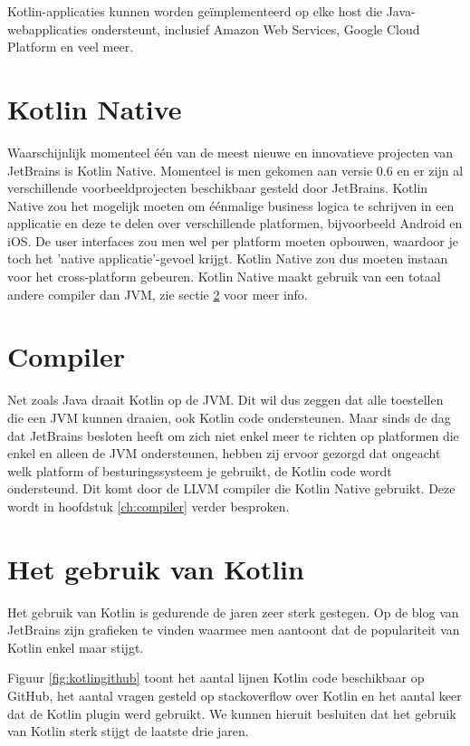 Kotlin-applicaties kunnen worden geïmplementeerd op elke host die Java-webapplicaties ondersteunt, inclusief Amazon Web Services, Google Cloud Platform en veel meer.

\section{Kotlin Native}
\label{sec:kotlinnative}
Waarschijnlijk momenteel één van de meest nieuwe en innovatieve projecten van JetBrains is Kotlin Native. Momenteel is men gekomen aan versie 0.6 en er zijn al verschillende voorbeeldprojecten beschikbaar gesteld door JetBrains. Kotlin Native zou het mogelijk moeten om éénmalige business logica te schrijven in een applicatie en deze te delen over verschillende platformen, bijvoorbeeld Android en iOS. De user interfaces zou men wel per platform moeten opbouwen, waardoor je toch het 'native applicatie'-gevoel krijgt. Kotlin Native zou dus moeten instaan voor het cross-platform gebeuren. Kotlin Native maakt gebruik van een totaal andere compiler dan JVM, zie sectie \ref{sec:llvm} voor meer info.

\section{Compiler}
\label{sec:llvm}
Net zoals Java draait Kotlin op de JVM. Dit wil dus zeggen dat alle toestellen die een JVM kunnen draaien, ook Kotlin code ondersteunen. Maar sinds de dag dat JetBrains besloten heeft om zich niet enkel meer te richten op platformen die enkel en alleen de JVM ondersteunen, hebben zij ervoor gezorgd dat ongeacht welk platform of besturingssysteem je gebruikt, de Kotlin code wordt ondersteund. Dit komt door de LLVM compiler die Kotlin Native gebruikt. Deze wordt in hoofdstuk \ref{ch:compiler} verder besproken.

\section{Het gebruik van Kotlin}
\label{sec:kotlingebruik}
Het gebruik van Kotlin is gedurende de jaren zeer sterk gestegen. Op de blog van JetBrains zijn grafieken te vinden waarmee men aantoont dat de populariteit van Kotlin enkel maar stijgt.

Figuur \ref{fig:kotlingithub} toont het aantal lijnen Kotlin code beschikbaar op GitHub, het aantal vragen gesteld op stackoverflow over Kotlin en het aantal keer dat de Kotlin plugin werd gebruikt. We kunnen hieruit besluiten dat het gebruik van Kotlin sterk stijgt de laatste drie jaren.

